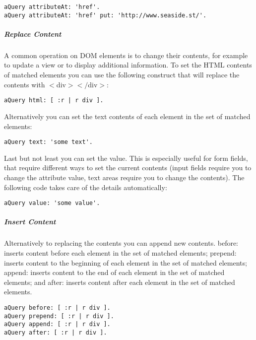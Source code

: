 \documentclass[a4paper,10pt,twoside]{book}
\newcommand{\ct}[1]{{\small\ttfamily\textup{#1}}}
\begin{document}
\begin{lstlisting}
aQuery attributeAt: 'href'.
aQuery attributeAt: 'href' put: 'http://www.seaside.st/'.
\end{lstlisting}

\subparagraph*{ Replace Content}
\label{book:web20:jquery:basics:performingactions:56857938}
A common operation on DOM elements is to change their contents, for example to update a view or to display additional information. To set the HTML contents of matched elements you can use the following construct that will replace the contents with \ct{$<$div$>$$<$$/$div$>$}:

\begin{lstlisting}
aQuery html: [ :r | r div ].
\end{lstlisting}

Alternatively you can set the text contents of each element in the set of matched elements:

\begin{lstlisting}
aQuery text: 'some text'.
\end{lstlisting}

Last but not least you can set the value. This is especially useful for form fields, that require different ways to set the current contents (input fields require you to change the attribute value, text areas require you to change the contents). The following code takes care of the details automatically:

\begin{lstlisting}
aQuery value: 'some value'.
\end{lstlisting}

\subparagraph*{ Insert Content}
\label{book:web20:jquery:basics:performingactions:105833543}
Alternatively to replacing the contents you can append new contents. \ct{before:} inserts content before each element in the set of matched elements; \ct{prepend:} inserts content to the beginning of each element in the set of matched elements; \ct{append:} inserts  content to the end of each element in the set of matched elements; and \ct{after:} inserts content after each element in the set of matched elements.

\begin{lstlisting}
aQuery before: [ :r | r div ].
aQuery prepend: [ :r | r div ].
aQuery append: [ :r | r div ].
aQuery after: [ :r | r div ].
\end{lstlisting}
\end{document}
